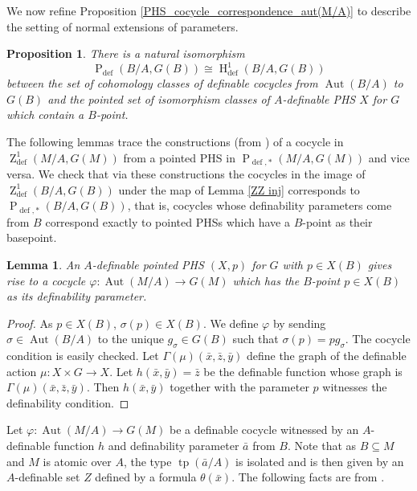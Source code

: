 \documentclass{article}
\theoremstyle{problemstyle}
\newtheorem{lemma}[problem]{Lemma}
\newtheorem{proposition}[problem]{Proposition}
\DeclareMathOperator{\defin}{def} %
\DeclareMathOperator{\tp}{tp} %
\DeclareMathOperator{\aut}{Aut} %
\DeclareMathOperator{\HH}{H} %
\DeclareMathOperator{\ZZ}{Z} %
\DeclareMathOperator{\PP}{P} %
\begin{document}
We now refine Proposition \ref{PHS_cocycle_correspondence_aut(M/A)} to describe the setting of normal extensions of parameters.

\begin{proposition}\label{CocyclePHScorrespB}
    There is a natural isomorphism $$\PP_{\defin}(B/A,G(B)) \cong \HH^1_{\defin}(B/A,G(B))$$ between the set of cohomology classes of definable cocycles from $\aut(B/A)$ to $G(B)$ and the pointed set of isomorphism classes of $A$-definable PHS $X$ for $G$ which contain a $B$-point.
\end{proposition}

The following lemmas trace the constructions (from \cite{pillay_1997}) of a cocycle in $\ZZ^{1}_{\defin}(M/A,G(M))$ from a pointed PHS in $\PP_{\defin,*}(M/A,G(M))$ and vice versa. We check that via these constructions the cocycles in the image of $\ZZ^{1}_{\defin}(B/A,G(B))$ under the map of Lemma \ref{ZZ inj} corresponds to $\PP_{\defin,*}(B/A,G(B))$, that is, cocycles whose definability parameters come from $B$ correspond exactly to pointed PHSs which have a $B$-point as their basepoint.

\begin{lemma}\label{pPHS to cocycle}
    An $A$-definable pointed PHS $(X,p)$ for $G$ with $p \in X(B)$ gives rise to a cocycle $\varphi:\aut(M/A) \to G(M)$ which has the $B$-point $p \in X(B)$ as its definability parameter.
\end{lemma}

\begin{proof}
    As $p \in X(B)$, $\sigma(p) \in X(B)$. We define $\varphi$ by sending $\sigma \in \aut(B/A)$ to the unique $g_\sigma \in G(B)$ such that $\sigma(p) = pg_\sigma$. The cocycle condition is easily checked. Let $\Gamma(\mu)(\bar{x},\bar{z},\bar{y})$ define the graph of the definable action $\mu:X \times G \to X$. Let $h(\bar{x},\bar{y}) = \bar{z}$ be the definable function whose graph is $\Gamma(\mu)(\bar{x},\bar{z},\bar{y})$. Then $h(\bar{x},\bar{y})$ together with the parameter $p$ witnesses the definability condition.
\end{proof}

Let $\varphi:\aut(M/A) \to G(M)$ be a definable cocycle witnessed by an $A$-definable function $h$ and definability parameter $\bar{a}$ from $B$. Note that as $B \subseteq M$ and $M$ is atomic over $A$, the type $\tp(\bar{a}/A)$ is isolated and is then given by an $A$-definable set $Z$ defined by a formula $\theta(\bar{x})$. The following facts are from \cite{pillay_1997}.   
\end{document}
